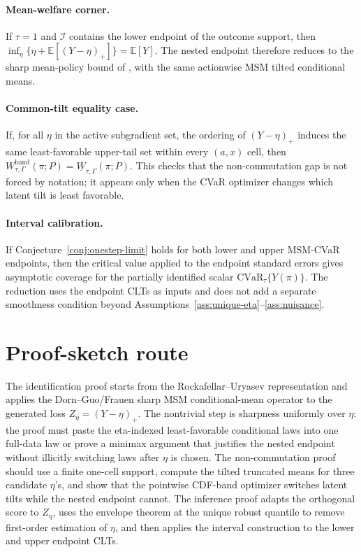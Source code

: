 \documentclass[11pt]{article}
\newcommand{\E}{\mathbb{E}}
\theoremstyle{definition}
\theoremstyle{plain}
\theoremstyle{remark}
\begin{document}
\paragraph{Mean-welfare corner.}
If \(\tau=1\) and \(\mathcal I\) contains the lower endpoint of the outcome support, then \(\inf_\eta\{\eta+\E[(Y-\eta)_+]\}=\E[Y]\).  The nested endpoint therefore reduces to the sharp mean-policy bound of \citet{HessFrauenMelnychukFeuerriegel2025SharpOPE}, with the same actionwise MSM tilted conditional means.

\paragraph{Common-tilt equality case.}
If, for all \(\eta\) in the active subgradient set, the ordering of \((Y-\eta)_+\) induces the same least-favorable upper-tail set within every \((a,x)\) cell, then \(W_{\tau,\Gamma}^{\mathrm{band}}(\pi;P)=\underline W_{\tau,\Gamma}(\pi;P)\).  This checks that the non-commutation gap is not forced by notation; it appears only when the CVaR optimizer changes which latent tilt is least favorable.

\paragraph{Interval calibration.}
If Conjecture~\ref{conj:onestep-limit} holds for both lower and upper MSM-CVaR endpoints, then the \citet{ImbensManski2004PartialIDCI} critical value applied to the endpoint standard errors gives asymptotic coverage for the partially identified scalar \(\mathrm{CVaR}_{\tau}\{Y(\pi)\}\).  The reduction uses the endpoint CLTs as inputs and does not add a separate smoothness condition beyond Assumptions~\ref{ass:unique-eta}--\ref{ass:nuisance}.

\section{Proof-sketch route}
The identification proof starts from the Rockafellar--Uryasev representation and applies the Dorn--Guo/Frauen sharp MSM conditional-mean operator to the generated loss \(Z_\eta=(Y-\eta)_+\).  The nontrivial step is sharpness uniformly over \(\eta\): the proof must paste the eta-indexed least-favorable conditional laws into one full-data law or prove a minimax argument that justifies the nested endpoint without illicitly switching laws after \(\eta\) is chosen.  The non-commutation proof should use a finite one-cell support, compute the tilted truncated means for three candidate \(\eta\)'s, and show that the pointwise CDF-band optimizer switches latent tilts while the nested endpoint cannot.  The inference proof adapts the \citet{DornGuoKallus2021DoublySharp} orthogonal score to \(Z_\eta\), uses the envelope theorem at the unique robust quantile to remove first-order estimation of \(\eta\), and then applies the \citet{ImbensManski2004PartialIDCI} interval construction to the lower and upper endpoint CLTs.
\end{document}
